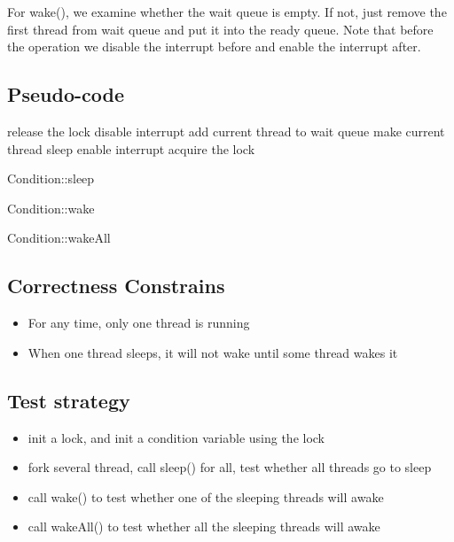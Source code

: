 \documentclass[a4paper,10pt]{article}
\begin{document}
For wake(), we examine whether the wait queue is empty. If not, just remove the first thread from wait queue and put it into the ready queue. Note that before the operation we disable the interrupt before and enable the interrupt after.
\subsection {Pseudo-code}

\begin{algorithm}
\DontPrintSemicolon %
release the lock\;
disable interrupt\;
add current thread to wait queue\;
make current thread sleep\;
enable interrupt\;
acquire the lock
\caption{Condition::sleep}
\label{algo:sleep}
\end{algorithm}

\begin{algorithm}
\caption{Condition::wake}
\end{algorithm}

\begin{algorithm}
\caption{Condition::wakeAll}
\end{algorithm}
\subsection{Correctness Constrains}
\begin{itemize}
\item For any time, only one thread is running
\item When one thread sleeps, it will not wake until some thread wakes it
\end{itemize}

\subsection {Test strategy}
\begin{itemize}
\item init a lock, and init a condition variable using the lock
\item fork several thread, call sleep() for all, test whether all threads go to sleep
\item call wake() to test whether one of the sleeping threads will awake
\item call wakeAll() to test whether all the sleeping threads will awake
\end{itemize}
\end{document}
